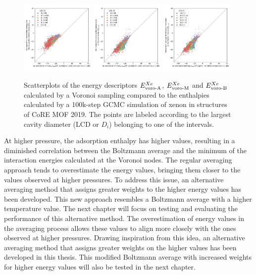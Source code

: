 \documentclass[main]{subfiles}
\begin{document}
\begin{figure}[ht]
    \centering
      \includegraphics[width=0.32\textwidth]{figures/3-fastsim/H_Xe_2080_vs_E_voro_A_overview.jpg}
      \includegraphics[width=0.32\textwidth]{figures/3-fastsim/H_Xe_2080_vs_E_voro_M_overview.jpg}
      \includegraphics[width=0.32\textwidth]{figures/3-fastsim/H_Xe_2080_vs_E_voro_B_overview.jpg}
      \caption{Scatterplots of the energy descriptors $E_{\text{voro-A}}^{Xe}$, $E_{\text{voro-M}}^{Xe}$ and $E_{\text{voro-B}}^{Xe}$ calculated by a Voronoi sampling compared to the enthalpies calculated by a 100k-step GCMC simulation of xenon in structures of CoRE MOF 2019. The points are labeled according to the largest cavity diameter (LCD or $D_i$) belonging to one of the intervals.}\label{fgr:compa_voro_2080}
  \end{figure}
  
At higher pressure, the adsorption enthalpy has higher values, resulting in a diminished correlation between the Boltzmann average and the minimum of the interaction energies calculated at the Voronoi nodes. The regular averaging approach tends to overestimate the energy values, bringing them closer to the values observed at higher pressures. To address this issue, an alternative averaging method that assigns greater weights to the higher energy values has been developed. This new approach resembles a Boltzmann average with a higher temperature value. The next chapter will focus on testing and evaluating the performance of this alternative method. The overestimation of energy values in the averaging process allows these values to align more closely with the ones observed at higher pressures. Drawing inspiration from this idea, an alternative averaging method that assigns greater weights on the higher values has been developed in this thesis. This modified Boltzmann average with increased weights for higher energy values will also be tested in the next chapter.
\end{document}
